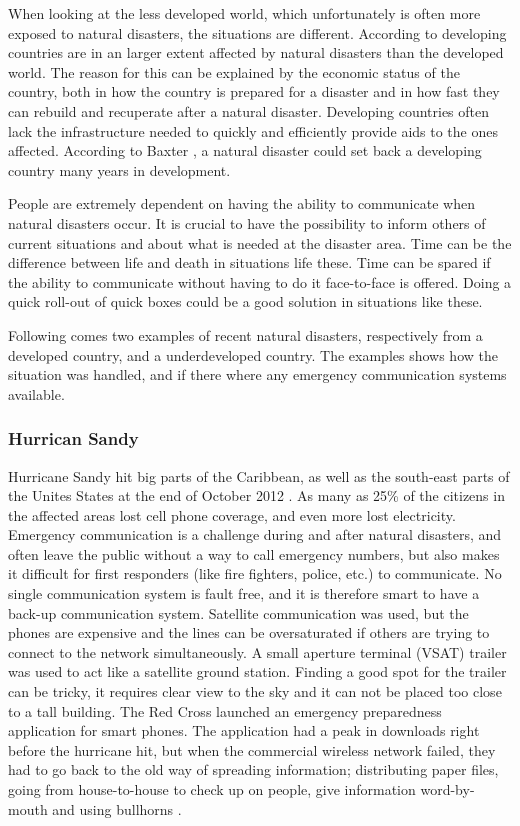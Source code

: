 When looking at the less developed world, which unfortunately is often more exposed to natural disasters, the situations are different. According to \cite{DevelopingWorld, 360} developing countries are in an larger extent affected by natural disasters than the developed world. The reason for this can be explained by the economic status of the country, both in how the country is prepared for a disaster and in how fast they can rebuild and recuperate after a natural disaster. Developing countries often lack the infrastructure needed to quickly and efficiently provide aids to the ones affected. According to Baxter \cite{360}, a natural disaster could set back a developing country many years in development.  

People are extremely dependent on having the ability to communicate when natural disasters occur. It is crucial to have the possibility to inform others of current situations and about what is needed at the disaster area. Time can be the difference between life and death in situations life these. Time can be spared if the ability to communicate without having to do it face-to-face is offered. Doing a quick roll-out of \gls{quick} boxes could be a good solution in situations like these. 

Following comes two examples of recent natural disasters, respectively from a developed country, and a underdeveloped country. The examples shows how the situation was handled, and if there where any emergency communication systems available. 

\subsubsection{Hurrican Sandy}
Hurricane Sandy hit big parts of the Caribbean, as well as the south-east parts of the Unites States at the end of October 2012 \cite{WikiSandy}. As many as 25\% of the citizens in the affected areas lost cell phone coverage, and even more lost electricity. Emergency communication is a challenge during and after natural disasters, and often leave the public without a way to call emergency numbers, but also makes it difficult for first responders (like fire fighters, police, etc.) to communicate. No single communication system is fault free, and it is therefore smart to have a back-up communication system. Satellite communication was used, but the phones are expensive and the lines can be oversaturated if others are trying to connect to the network simultaneously. A small aperture terminal (VSAT) trailer was used to act like a satellite ground station. Finding a good spot for the trailer can be tricky, it requires clear view to the sky and it can not be placed too close to a tall building. The Red Cross launched an emergency preparedness application for smart phones. The application had a peak in downloads right before the hurricane hit, but when the commercial wireless network failed, they had to go back to the old way of spreading information; distributing paper files, going from house-to-house to check up on people, give information word-by-mouth and using bullhorns \cite{hurricaneSandy}.

